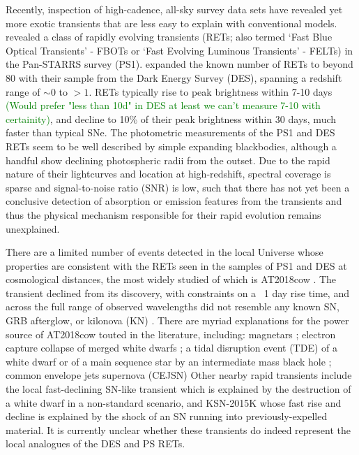 \documentclass[fleqn,usenatbib,]{mnras}
\begin{document}
Recently, inspection of high-cadence, all-sky survey data sets have revealed yet more exotic transients that are less easy to explain with conventional models. \citet{Drout2014} revealed a class of rapidly evolving transients (RETs; also termed `Fast Blue Optical Transients' - FBOTs or `Fast Evolving Luminous Transients' - FELTs) in the Pan-STARRS survey (PS1). \citet{Pursiainen2018} expanded the known number of RETs to beyond 80 with their sample from the Dark Energy Survey (DES), spanning a redshift range of $\sim 0$ to $>1$. RETs typically rise to peak brightness within 7-10 days \textcolor{green}{(Would prefer "less than 10d" in DES at least we can't measure 7-10 with certainity)}, and decline to 10\% of their peak brightness within 30 days, much faster than typical SNe. The photometric measurements of the PS1 and DES RETs seem to be well described by simple expanding blackbodies, although a handful show declining photospheric radii from the outset. Due to the rapid nature of their lightcurves and location at high-redshift, spectral coverage is sparse and signal-to-noise ratio (SNR) is low, such that there has not yet been a conclusive detection of absorption or emission features from the transients and thus the physical mechanism responsible for their rapid evolution remains unexplained.

There are a limited number of events detected in the local Universe whose properties are consistent with the RETs seen in the samples of PS1 and DES at cosmological distances, the most widely studied of which is AT2018cow \citep[e.g.][]{Prentice2018,Perley2019}. The transient declined from its discovery, with constraints on a ~1 day rise time, and across the full range of observed wavelengths did not resemble any known SN, GRB afterglow, or kilonova (KN) \citep{Ho2019}. There are myriad explanations for the power source of AT2018cow touted in the literature, including: magnetars \citep{Mohan2020}; electron capture collapse of merged white dwarfs \citep{Lyutikov2019}; a tidal disruption event (TDE) of a white dwarf \citep{Kuin2019} or of a main sequence star by an intermediate mass black hole \citep{Perley2019}; common envelope jets supernova (CEJSN) \citep{Soker2019}
Other nearby rapid transients include the local fast-declining SN-like transient \citep{McBrien2019} which is explained by the destruction of a white dwarf in a non-standard scenario, and KSN-2015K \citep{Rest2018} whose fast rise and decline is explained by the shock of an SN running into previously-expelled material.  It is currently unclear whether these transients do indeed represent the local analogues of the DES and PS RETs.
\end{document}

